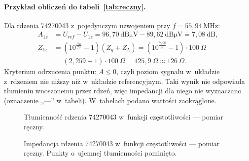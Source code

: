 \documentclass[11pt,a4paper]{article}
\begin{document}
\paragraph{Przykład obliczeń do tabeli~\ref{tab:reczny}.}
Dla rdzenia 74270043 z~pojedynczym uzwojeniem przy $f = 55{,}94\ \mathrm{MHz}$:
\begin{align*}
A_{1z} &= U_{ref} - U_{1z} = 96{,}70\ \mathrm{dB\mu V} - 89{,}62\ \mathrm{dB\mu V}
        = 7{,}08\ \mathrm{dB},\\
Z_{1z} &= \left( 10^{\frac{A_{1z}}{20}} - 1 \right)(Z_g + Z_L)
        = \left( 10^{\frac{7{,}08}{20}} - 1 \right) \cdot 100\ \Omega\\
       &= (2{,}259 - 1) \cdot 100\ \Omega = 125{,}9\ \Omega \approx 126\ \Omega .
\end{align*}
Kryterium odrzucenia punktu: $A \le 0$, czyli poziom sygnału w~układzie z~rdzeniem
nie niższy niż w~układzie referencyjnym. Taki wynik nie odpowiada tłumieniu wnoszonemu
przez rdzeń, więc impedancji dla niego nie wyznaczano (oznaczenie „---” w~tabeli).
W~tabelach podano wartości zaokrąglone.

\begin{figure}[htb]
  \centering
  \caption{Tłumienność rdzenia 74270043 w~funkcji częstotliwości --- pomiar ręczny.}
  \label{fig:reczny-A}
\end{figure}

\begin{figure}[htb]
  \centering
  \caption{Impedancja rdzenia 74270043 w~funkcji częstotliwości --- pomiar ręczny.
           Punkty o~ujemnej tłumienności pominięto.}
  \label{fig:reczny-Z}
\end{figure}
\end{document}
